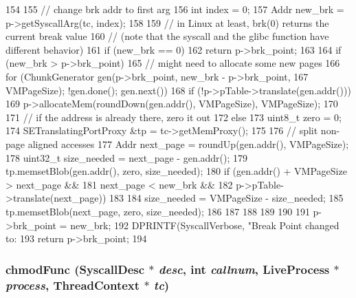 \begin{DoxyCode}
154 {
155     // change brk addr to first arg
156     int index = 0;
157     Addr new_brk = p->getSyscallArg(tc, index);
158 
159     // in Linux at least, brk(0) returns the current break value
160     // (note that the syscall and the glibc function have different behavior)
161     if (new_brk == 0)
162         return p->brk_point;
163 
164     if (new_brk > p->brk_point) {
165         // might need to allocate some new pages
166         for (ChunkGenerator gen(p->brk_point, new_brk - p->brk_point,
167                                 VMPageSize); !gen.done(); gen.next()) {
168             if (!p->pTable->translate(gen.addr()))
169                 p->allocateMem(roundDown(gen.addr(), VMPageSize), VMPageSize);
170 
171             // if the address is already there, zero it out
172             else {
173                 uint8_t zero  = 0;
174                 SETranslatingPortProxy &tp = tc->getMemProxy();
175 
176                 // split non-page aligned accesses
177                 Addr next_page = roundUp(gen.addr(), VMPageSize);
178                 uint32_t size_needed = next_page - gen.addr();
179                 tp.memsetBlob(gen.addr(), zero, size_needed);
180                 if (gen.addr() + VMPageSize > next_page &&
181                     next_page < new_brk &&
182                     p->pTable->translate(next_page))
183                 {
184                     size_needed = VMPageSize - size_needed;
185                     tp.memsetBlob(next_page, zero, size_needed);
186                 }
187             }
188         }
189     }
190 
191     p->brk_point = new_brk;
192     DPRINTF(SyscallVerbose, "Break Point changed to: %
193     return p->brk_point;
194 }
\end{DoxyCode}
\hypertarget{syscall__emul_8hh_a8efc7888235c588ed8456c16d4c6f1ab}{
\subsubsection[{chmodFunc}]{ chmodFunc ({\bf SyscallDesc} $\ast$ {\em desc}, \/  int {\em callnum}, \/  {\bf LiveProcess} $\ast$ {\em process}, \/  {\bf ThreadContext} $\ast$ {\em tc})}}
\label{syscall__emul_8hh_a8efc7888235c588ed8456c16d4c6f1ab}


